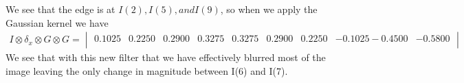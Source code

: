 \documentclass[11pt,english]{article}
\begin{document}
We see that the edge is at $ I(2) ,I(5), and I(9)$, so when we apply the Gaussian kernel we have 
    \begin{align*}
 I \otimes \delta_x \otimes G \otimes G = 
 \begin{vmatrix}
  0.1025 &   0.2250 &   0.2900  &  0.3275   & 0.3275  &  0.2900   & 0.2250 &   -0.1025   -0.4500  & -0.5800\\
\end{vmatrix}    
\end{align*}
We see that with this new filter that we have effectively blurred most of the image leaving the only change in magnitude between I(6) and I(7). 
\end{document}
